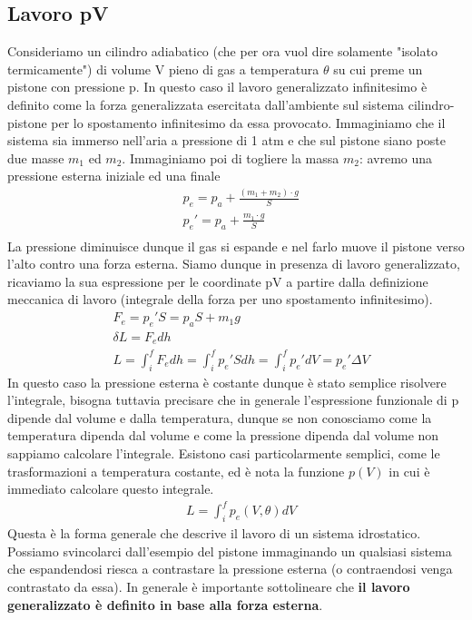 \documentclass[10pt,a4paper]{article}
\begin{document}
\subsection{Lavoro pV}
Consideriamo un cilindro adiabatico (che per ora vuol dire solamente "isolato termicamente") di volume V pieno di gas a temperatura $\theta$ su cui preme un pistone con pressione p. In questo caso il lavoro generalizzato infinitesimo è definito come la forza generalizzata esercitata dall'ambiente sul sistema cilindro-pistone per lo spostamento infinitesimo da essa provocato. Immaginiamo che il sistema sia immerso nell'aria a pressione di 1 atm e che sul pistone siano poste due masse $m_1$ ed $m_2$. Immaginiamo poi di togliere la massa $m_2$: avremo una pressione esterna iniziale ed una finale
\begin{align*} 
&p_e=p_a+\frac{(m_1+m_2)\cdot g}{S}\\
&p_e'=p_a+\frac{m_1\cdot g}{S}\\
\end{align*} 
La pressione diminuisce dunque il gas si espande e nel farlo muove il pistone verso l'alto contro una forza esterna. Siamo dunque in presenza di lavoro generalizzato, ricaviamo la sua espressione per le coordinate pV a partire dalla definizione meccanica di lavoro (integrale della forza per uno spostamento infinitesimo). 
\begin{align*} 
	&F_e = p_e' S = p_a S + m_1 g\\
	&\delta L = F_e dh\\
	&L= \int_{i}^{f}F_e dh = \int_{i}^{f} p_e' S dh = \int_{i}^{f} p_e' dV = p_e' \Delta V
\end{align*} 
In questo caso la pressione esterna è costante dunque è stato semplice risolvere l'integrale, bisogna tuttavia precisare che in generale l'espressione funzionale di p dipende dal volume e dalla temperatura, dunque se non conosciamo come la temperatura dipenda dal volume e come la pressione dipenda dal volume non sappiamo calcolare l'integrale. Esistono casi particolarmente semplici, come le trasformazioni a temperatura costante, ed è nota la funzione $p(V)$ in cui è immediato calcolare questo integrale.
\begin{align*} 
	&L= \int_{i}^{f} p_e(V,\theta) dV
\end{align*} 
Questa è la forma generale che descrive il lavoro di un sistema idrostatico. Possiamo svincolarci dall'esempio del pistone immaginando un qualsiasi sistema che espandendosi riesca a contrastare la pressione esterna (o contraendosi venga contrastato da essa). In generale è importante sottolineare che \textbf{il lavoro generalizzato è definito in base alla forza esterna}. \\
\end{document}
